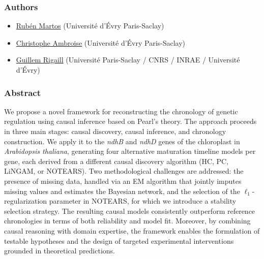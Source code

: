\documentclass[
  11pt,
  a4paper,
]{article}
\providecommand{\tightlist}{%
  \setlength{\itemsep}{0pt}\setlength{\parskip}{0pt}}\usepackage{longtable,booktabs,array}
\begin{document}
\subsubsection{Authors}\label{authors}

\begin{itemize}
\tightlist
\item
  \href{}{Rubén Martos} (Université d'Évry Paris-Saclay)
\item
  \href{}{Christophe Ambroise} (Université d'Évry Paris-Saclay)
\item
  \href{}{Guillem Rigaill} (Université Paris-Saclay / CNRS / INRAE /
  Université d'Évry)
\end{itemize}

\subsubsection{Abstract}\label{abstract}

We propose a novel framework for reconstructing the chronology of
genetic regulation using causal inference based on Pearl's theory. The
approach proceeds in three main stages: causal discovery, causal
inference, and chronology construction. We apply it to the \emph{ndhB}
and \emph{ndhD} genes of the chloroplast in \emph{Arabidopsis thaliana},
generating four alternative maturation timeline models per gene, each
derived from a different causal discovery algorithm (HC, PC, LiNGAM, or
NOTEARS). Two methodological challenges are addressed: the presence of
missing data, handled via an EM algorithm that jointly imputes missing
values and estimates the Bayesian network, and the selection of the
\(\ell_1\)-regularization parameter in NOTEARS, for which we introduce a
stability selection strategy. The resulting causal models consistently
outperform reference chronologies in terms of both reliability and model
fit. Moreover, by combining causal reasoning with domain expertise, the
framework enables the formulation of testable hypotheses and the design
of targeted experimental interventions grounded in theoretical
predictions.
\end{document}
